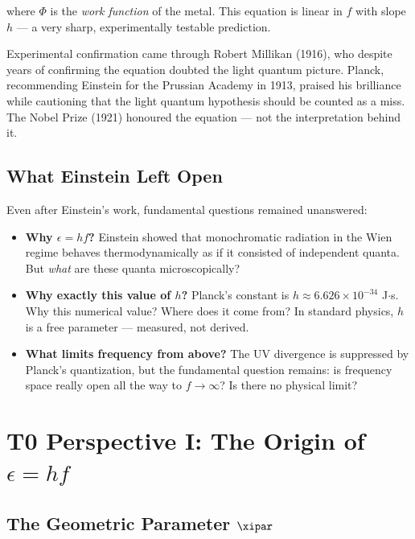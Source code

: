 where $\Phi$ is the \emph{work function} of the metal. This equation is linear in $f$ 
with slope $h$ — a very sharp, experimentally testable prediction.

Experimental confirmation came through Robert Millikan (1916), who despite years of 
confirming the equation doubted the light quantum picture. Planck, recommending 
Einstein for the Prussian Academy in 1913, praised his brilliance while cautioning 
that the light quantum hypothesis should be counted as a miss. The Nobel Prize (1921) 
honoured the equation — not the interpretation behind it.

\subsection{What Einstein Left Open}

Even after Einstein's work, fundamental questions remained unanswered:

\begin{itemize}
    \item \textbf{Why $\epsilon = hf$?} Einstein showed that monochromatic radiation 
    in the Wien regime behaves thermodynamically as if it consisted of independent 
    quanta. But \emph{what} are these quanta microscopically?
    
    \item \textbf{Why exactly this value of $h$?} Planck's constant is 
    $h \approx 6.626 \times 10^{-34}$ J$\cdot$s. Why this numerical value? 
    Where does it come from? In standard physics, $h$ is a free parameter — 
    measured, not derived.
    
    \item \textbf{What limits frequency from above?} The UV divergence is suppressed 
    by Planck's quantization, but the fundamental question remains: is frequency 
    space really open all the way to $f \to \infty$? Is there no physical limit?
\end{itemize}

\clearpage

\section{T0 Perspective I: The Origin of $\epsilon = hf$}
\label{sec:t0_quantization}

\subsection{The Geometric Parameter $\xipar$}

